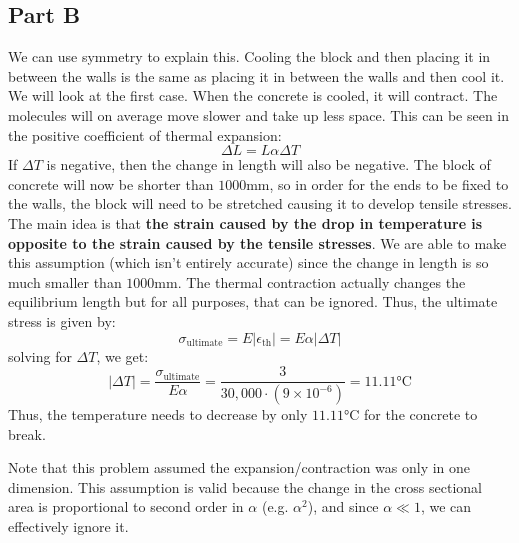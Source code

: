 \documentclass{article}
\begin{document}
\subsection{Part B}
We can use symmetry to explain this. Cooling the block and then placing it in between the walls is the same as placing it in between the walls and then cool it. We will look at the first case. When the concrete is cooled, it will contract. The molecules will on average move slower and take up less space. This can be seen in the positive coefficient of thermal expansion:
\begin{equation}
    \Delta L= L\alpha\Delta T
    \label{eq:}
\end{equation}
If $\Delta T$ is negative, then the change in length will also be negative. The block of concrete will now be shorter than $1000\si{\milli\meter}$, so in order for the ends to be fixed to the walls, the block will need to be stretched causing it to develop tensile stresses. The main idea is that \textbf{the strain caused by the drop in temperature is opposite to the strain caused by the tensile stresses}. We are able to make this assumption (which isn't entirely accurate) since the change in length is so much smaller than $1000\si{\milli\metre}$. The thermal contraction actually changes the equilibrium length but for all purposes, that can be ignored. Thus, the ultimate stress is given by:
\begin{equation}
    \sigma_\text{ultimate} = E|\epsilon_\text{th}| = E\alpha |\Delta T|
    \label{eq:}
\end{equation}
solving for $\Delta T$, we get:
\begin{equation}
    |\Delta T| = \frac{\sigma_\text{ultimate}}{E\alpha} = \frac{3}{30,000\cdot (9\times 10^{-6})} = 11.11\si{\celsius}
    \label{eq:}
\end{equation}
Thus, the temperature needs to decrease by only $11.11\si{\celsius}$ for the concrete to break.

Note that this problem assumed the expansion/contraction was only in one dimension. This assumption is valid because the change in the cross sectional area is proportional to second order in $\alpha$ (e.g. $\alpha^2$), and since $\alpha \ll 1$, we can effectively ignore it.

\newpage
\end{document}
